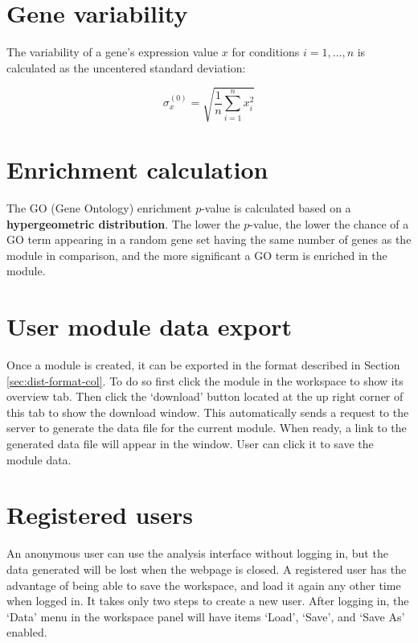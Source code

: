 \section{Gene variability}\label{apd:gene-sd}

The variability of a gene's expression value $x$ for conditions $i=1,…,n$ is 
calculated as the uncentered standard deviation: 

\begin{equation}
\sigma_x^{(0)}=\sqrt{\frac{1}{n}\sum\limits_{i=1}^{n}x_i^2}
\end{equation}


\section{Enrichment calculation}\label{apd:enrichment}

The GO (Gene Ontology) enrichment $p$-value is calculated based on a 
\textbf{hypergeometric distribution}. The lower the $p$-value, the lower the 
chance of a GO term appearing in a random gene set having the same number of 
genes as the module in comparison, and the more significant a GO term is 
enriched in the module.

\section{User module data export}\label{apd:data-download}

Once a module is created, it can be exported in the format described 
in Section \ref{sec:dist-format-col}. 
To do so first click the module in the workspace to show its 
overview tab. 
Then click the `download' button located at the up right corner of 
this tab to show the download window. 
This automatically sends a request to the server to generate the data file for 
the current module. 
When ready, a link to the generated data file will appear in the window. 
User can click it to save the module data.


\section{Registered users}\label{apd:colombos-user}

An anonymous user can use the analysis interface without logging in, but the 
data generated will be lost when the webpage is closed. A registered user has 
the advantage of being able to save the workspace, and load it again any other 
time when logged in. It takes only two steps to create a new user. After 
logging in, the `Data' menu in the workspace panel will have items 
`Load', `Save', and `Save As' enabled.




\cleardoublepage

